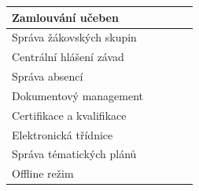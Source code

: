 \documentclass[FM,Proj]{tulthesis}
\newcommand{\ccheckmark}{{\color[HTML]{009901} \CheckmarkBold}}
\newcommand{\ccrossmark}{{\color[HTML]{CB0000} \XSolid}}
\begin{document}
\begin{table}[H]
\begin{tabular}{lcccc}
    \multicolumn{1}{|l|}{Zamlouvání učeben}             & \multicolumn{1}{c|}{\ccrossmark}          & \multicolumn{1}{c|}{\ccrossmark} & \multicolumn{1}{c|}{\ccrossmark}                                        & \multicolumn{1}{c|}{\ccrossmark}          \\ \hline
    \multicolumn{1}{|l|}{Správa žákovských skupin}      & \multicolumn{1}{c|}{\ccrossmark}          & \multicolumn{1}{c|}{\ccheckmark} & \multicolumn{1}{c|}{\ccheckmark}                                        & \multicolumn{1}{c|}{\ccrossmark}          \\ \hline
    \multicolumn{1}{|l|}{Centrální hlášení závad}       & \multicolumn{1}{c|}{\ccheckmark}          & \multicolumn{1}{c|}{\ccrossmark} & \multicolumn{1}{c|}{\ccrossmark}                                        & \multicolumn{1}{c|}{\ccrossmark}          \\ \hline
    \multicolumn{1}{|l|}{Správa absencí}                & \multicolumn{1}{c|}{\ccheckmark}          & \multicolumn{1}{c|}{\ccheckmark} & \multicolumn{1}{c|}{\ccheckmark}                                        & \multicolumn{1}{c|}{\ccheckmark}          \\ \hline
    \multicolumn{1}{|l|}{Dokumentový management}        & \multicolumn{1}{c|}{\ccheckmark}          & \multicolumn{1}{c|}{\ccrossmark} & \multicolumn{1}{c|}{\ccrossmark}                                        & \multicolumn{1}{c|}{\ccrossmark}          \\ \hline
    \multicolumn{1}{|l|}{Certifikace a kvalifikace}     & \multicolumn{1}{c|}{\ccheckmark}          & \multicolumn{1}{c|}{\ccrossmark} & \multicolumn{1}{c|}{\ccrossmark}                                        & \multicolumn{1}{c|}{\ccrossmark}          \\ \hline
    \multicolumn{1}{|l|}{Elektronická třídnice}         & \multicolumn{1}{c|}{\ccrossmark}          & \multicolumn{1}{c|}{\ccheckmark} & \multicolumn{1}{c|}{\ccheckmark}                                        & \multicolumn{1}{c|}{\ccheckmark}          \\ \hline
    \multicolumn{1}{|l|}{Správa tématických plánů}      & \multicolumn{1}{c|}{\ccheckmark}          & \multicolumn{1}{c|}{\ccheckmark} & \multicolumn{1}{c|}{\ccheckmark}                                        & \multicolumn{1}{c|}{\ccrossmark}          \\ \hline
    \multicolumn{1}{|l|}{Offline režim}                 & \multicolumn{1}{c|}{\ccrossmark}          & \multicolumn{1}{c|}{\ccheckmark} & \multicolumn{1}{c|}{\ccrossmark}                                        & \multicolumn{1}{c|}{\ccrossmark}          \\ \hline

\end{tabular}
\end{table}
\end{document}
